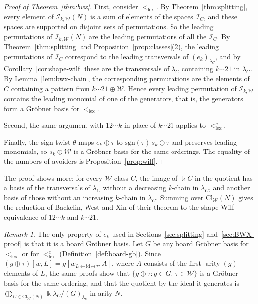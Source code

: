 \documentclass[11pt]{amsart}
\theoremstyle{definition}
\theoremstyle{remark}
\newtheorem{remark}[theorem]{Remark}
\newcommand{\kk}{\Bbbk}
\newcommand{\sgn}{\mathrm{sgn}}
\newcommand{\Cl}{\mathrm{Cl}}
\newcommand{\cI}{\mathscr{I}}
\newcommand{\cW}{\mathcal{W}}
\newcommand{\id}{\mathrm{id}}
\newcommand{\lex}{\mathrm{lex}}
\begin{document}
\begin{proof}[Proof of Theorem~\ref{thm:bwx}]
First, consider $<_\lex$. By Theorem~\ref{thm:splitting}, every element of $\cI_{k,\cW}(N)$ is a sum of elements of the spaces $\cI_C$, and these spaces are supported on disjoint sets of permutations. So the leading permutations of $\cI_{k,\cW}(N)$ are the leading permutations of all the $\cI_C$. By Theorem~\ref{thm:splitting} and Proposition~\ref{prop:classes}(2), the leading permutations of $\cI_C$ correspond to the leading transversals of $(e_k)_{\lambda_C}$, and by Corollary~\ref{cor:shape-wilf} these are the transversals of $\lambda_C$ containing $k\cdots21$ in $\lambda_C$. By Lemma~\ref{lem:bwx-chain}, the corresponding permutations are the elements of $C$ containing a pattern from $k\cdots21\oplus\cW$. Hence every leading permutation of $\cI_{k,\cW}$ contains the leading monomial of one of the generators, that is, the generators form a Gr\"obner basis for $<_\lex$.

Second, the same argument with $12\cdots k$ in place of $k\cdots21$ applies to $<_\lex^c$.

Finally, the sign twist $\theta$ maps $e_k\oplus\tau$ to $\sgn(\tau)\,s_k\oplus\tau$ and preserves leading monomials, so $s_k\oplus\cW$ is a Gr\"obner basis for the same orderings. The equality of the numbers of avoiders is Proposition~\ref{prop:wilf}.
\end{proof}

The proof shows more: for every $\cW$-class $C$, the image of $\kk C$ in the quotient has a basis of the transversals of $\lambda_C$ without a decreasing $k$-chain in $\lambda_C$, and another basis of those without an increasing $k$-chain in $\lambda_C$. Summing over $\Cl_\cW(N)$ gives the reduction of Backelin, West and Xin of their theorem to the shape-Wilf equivalence of $12\cdots k$ and $k\cdots21$.

\begin{remark}\label{rem:board-general}
The only property of $e_k$ used in Sections~\ref{sec:splitting} and~\ref{sec:BWX-proof} is that it is a board Gr\"obner basis. Let $G$ be any board Gr\"obner basis for $<_\lex$ or for $<_\lex^c$ (Definition~\ref{def:board-gb}). Since $(g\oplus\tau)[w,L]=g[w_{L\leftarrow\id\oplus\tau},A]$, where $A$ consists of the first $\operatorname{arity}(g)$ elements of $L$, the same proofs show that $\{g\oplus\tau:g\in G,\ \tau\in\cW\}$ is a Gr\"obner basis for the same ordering, and that the quotient by the ideal it generates is $\bigoplus_{C\in\Cl_\cW(N)}\kk\lambda_C/(G)_{\lambda_C}$ in arity $N$.
\end{remark}
\end{document}
